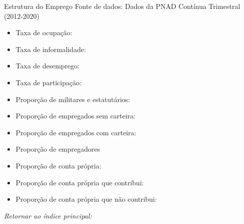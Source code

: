 \begin{frame}[label=_estrutura_emprego]{Estrutura do Emprego}
{\footnotesize Fonte de dados: Dados da PNAD Contínua Trimestral (2012-2020)}
\begin{itemize}
\item{Taxa de ocupação: \hyperlink{_estrutura_emprego_taxa_de_ocupacao}{}}
\item{Taxa de informalidade: \hyperlink{_estrutura_emprego_taxa_de_informalidade}{}}
\item{Taxa de desemprego: \hyperlink{_estrutura_emprego_taxa_de_desemprego}{}}
\item{Taxa de participação: \hyperlink{_estrutura_emprego_taxa_de_participacao}{}}
\item{Proporção de militares e estatutários: \hyperlink{_estrutura_emprego_prop_militar}{}}
\item{Proporção de empregados sem carteira: \hyperlink{_estrutura_emprego_prop_empregadoSC}{}}
\item{Proporção de empregados com carteira: \hyperlink{_estrutura_emprego_prop_empregadoCC}{}}
\item{Proporção de empregadores \hyperlink{_estrutura_emprego_prop_empregador}{}}
\item{Proporção de conta própria: \hyperlink{_estrutura_emprego_prop_cpropria}{}}
\item{Proporção de conta própria que contribui: \hyperlink{_estrutura_emprego_prop_cpropriaC}{}}
\item{Proporção de conta própria que não contribui: \hyperlink{_estrutura_emprego_prop_cpropriaNc}{}}
\end{itemize}

\begin{small}
\textit{Retornar ao índice principal: \hyperlink{indice_principal}{} }
\end{small}

\end{frame}

